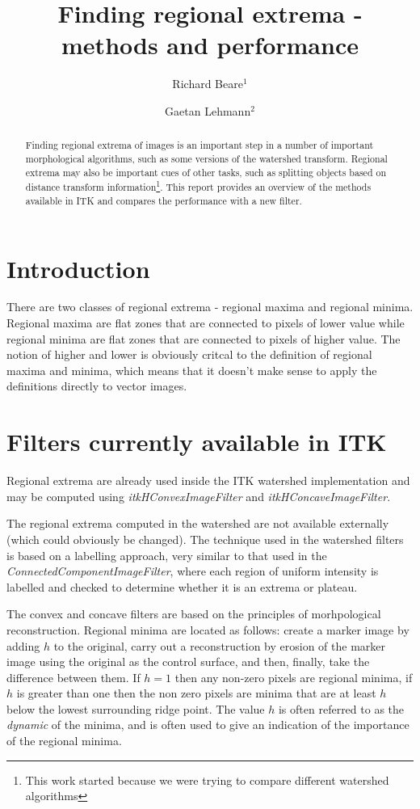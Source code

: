 \documentclass{llncs}
\begin{document}
\title{Finding regional extrema - methods and performance}
\author{Richard Beare{$^1$} \and Gaetan Lehmann{$^2$}}
\maketitle

\begin{abstract}
Finding regional extrema of images is an important step in a number of
important morphological algorithms, such as some versions of the
watershed transform. Regional extrema may also be important cues of
other tasks, such as splitting objects based on distance transform
information\footnote{This work started because we were trying to
compare different watershed algorithms}. This report provides an
overview of the methods available in ITK and compares the performance
with a new filter.
\end{abstract}

\section{Introduction}
There are two classes of regional extrema - regional maxima and
regional minima. Regional maxima are flat zones that are connected to
pixels of lower value while regional minima are flat zones that are
connected to pixels of higher value. The notion of higher and lower is
obviously critcal to the definition of regional maxima and minima,
which means that it doesn't make sense to apply the definitions
directly to vector images.

\section{Filters currently available in ITK}
Regional extrema are already used inside the ITK watershed
implementation and may be computed using {\em itkHConvexImageFilter}
and {\em itkHConcaveImageFilter}. 

The regional extrema computed in the watershed are not available
externally (which could obviously be changed). The technique used in
the watershed filters is based on a labelling approach, very similar
to that used in the {\em ConnectedComponentImageFilter}, where each
region of uniform intensity is labelled and checked to determine
whether it is an extrema or plateau.

The convex and concave filters are based on the principles of
morhpological reconstruction. Regional minima are located as follows:
create a marker image by adding $h$ to the original, carry out a
reconstruction by erosion of the marker image using the original as
the control surface, and then, finally, take the difference between
them. If $h=1$ then any non-zero pixels are regional minima, if $h$ is
greater than one then the non zero pixels are minima that are at least
$h$ below the lowest surrounding ridge point. The value $h$ is often
referred to as the {\em dynamic} of the minima, and is often used to
give an indication of the importance of the regional minima.
\end{document}
